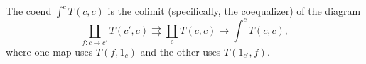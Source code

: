 The coend $\int^c T(c, c)$ is the colimit (specifically, the coequalizer) of the diagram
\[
\coprod_{f: c \rightarrow c'} T(c', c) \rightrightarrows \coprod_{c} T(c, c) \rightarrow \int^c T(c, c),
\]
where one map uses $T(f, 1_c)$ and the other uses $T(1_{c'}, f)$.